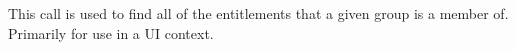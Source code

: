 This call is used to find all of the entitlements that a given group is a member of. Primarily for use
in a UI context.
